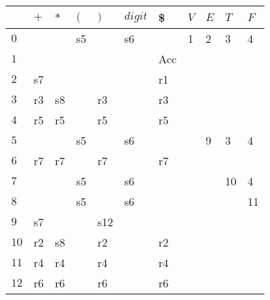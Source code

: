 \documentclass{standalone}
\providecommand\lightrule{%
	\arrayrulecolor{black!30}%
	\midrule[\lightrulewidth]%
	\arrayrulecolor{black}}
\begin{document}
	\begin{tabularx}{\textwidth}{XXXXXXXXXXX}
         & \(+\) & \(*\) & \((\) & \()\) & \(digit\) & \$ & \(V\) & \(E\) & \(T\) & \(F\) \\
        \midrule
            \(0\) & & & s5 & & s6 & & 1 & 2 & 3 & 4
            \\ \lightrule
            \(1\) & & & & & & Acc & & & &
            \\ \lightrule
            \(2\) & s7 & & & & & r1 & & & &
            \\ \lightrule
            \(3\) & r3 & s8 & & r3 & & r3 & & & &
            \\ \lightrule
            \(4\) & r5 & r5 & & r5 & & r5 & & & &
            \\ \lightrule
            \(5\) & & & s5 & & s6 & & & 9 & 3 & 4
            \\ \lightrule
            \(6\) & r7 & r7 & & r7 & & r7 & & & &
            \\ \lightrule
            \(7\) & & & s5 & & s6 & & & & 10 & 4
            \\ \lightrule
            \(8\) & & & s5 & & s6 & & & & & 11
            \\ \lightrule
            \(9\) & s7 & & & s12 & & & & & &
            \\ \lightrule
            \(10\) & r2 & s8 & & r2 & & r2 & & & &
            \\ \lightrule
            \(11\) & r4 & r4 & & r4 & & r4 & & & &
            \\ \lightrule
            \(12\) & r6 & r6 & & r6 & & r6 & & & &
    \end{tabularx}
\end{document}
